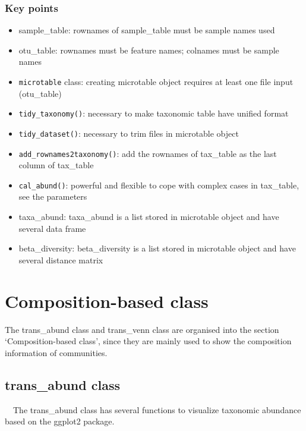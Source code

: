 \documentclass[
]{book}
\providecommand{\tightlist}{%
  \setlength{\itemsep}{0pt}\setlength{\parskip}{0pt}}
\begin{document}
\hypertarget{key-points}{%
\subsection{Key points}\label{key-points}}

\begin{itemize}
\tightlist
\item
  sample\_table: rownames of sample\_table must be sample names used
\item
  otu\_table: rownames must be feature names; colnames must be sample names
\item
  \texttt{microtable} class: creating microtable object requires at least one file input (otu\_table)
\item
  \texttt{tidy\_taxonomy()}: necessary to make taxonomic table have unified format
\item
  \texttt{tidy\_dataset()}: necessary to trim files in microtable object
\item
  \texttt{add\_rownames2taxonomy()}: add the rownames of tax\_table as the last column of tax\_table
\item
  \texttt{cal\_abund()}: powerful and flexible to cope with complex cases in tax\_table, see the parameters
\item
  taxa\_abund: taxa\_abund is a list stored in microtable object and have several data frame
\item
  beta\_diversity: beta\_diversity is a list stored in microtable object and have several distance matrix
\end{itemize}

\hypertarget{composition-based-class}{%
\chapter{Composition-based class}\label{composition-based-class}}

The trans\_abund class and trans\_venn class are organised into the section `Composition-based class',
since they are mainly used to show the composition information of communities.

\hypertarget{trans_abund-class}{%
\section{trans\_abund class}\label{trans_abund-class}}

　The trans\_abund class has several functions to visualize taxonomic abundance based on the ggplot2 package.
\end{document}
